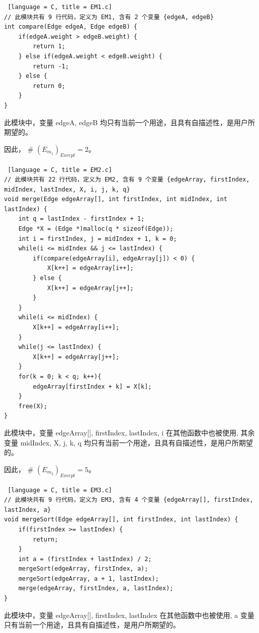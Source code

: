 \documentclass[14pt,a4paper,UTF8,twoside]{article}
\begin{document}
\begin{lstlisting} [language = C, title = EM1.c]
// 此模块共有 9 行代码，定义为 EM1, 含有 2 个变量 {edgeA, edgeB}
int compare(Edge edgeA, Edge edgeB) {
    if(edgeA.weight > edgeB.weight) {
        return 1;
    } else if(edgeA.weight < edgeB.weight) {
        return -1;
    } else {
        return 0;
    }
}
\end{lstlisting}

此模块中，变量 edgeA, edgeB 均只有当前一个用途，且具有自描述性，是用户所期望的。

因此， \# $(E_{m_1})_{Except} = 2$。

\begin{lstlisting} [language = C, title = EM2.c]
// 此模块共有 22 行代码，定义为 EM2, 含有 9 个变量 {edgeArray, firstIndex, midIndex, lastIndex, X, i, j, k, q}
void merge(Edge edgeArray[], int firstIndex, int midIndex, int lastIndex) {
    int q = lastIndex - firstIndex + 1;
    Edge *X = (Edge *)malloc(q * sizeof(Edge));
    int i = firstIndex, j = midIndex + 1, k = 0;
    while(i <= midIndex && j <= lastIndex) {
        if(compare(edgeArray[i], edgeArray[j]) < 0) {
            X[k++] = edgeArray[i++];
        } else {
            X[k++] = edgeArray[j++];
        }
    }
    while(i <= midIndex) {
        X[k++] = edgeArray[i++];
    }
    while(j <= lastIndex) {
        X[k++] = edgeArray[j++];
    }
    for(k = 0; k < q; k++){
        edgeArray[firstIndex + k] = X[k];
    }
    free(X);
}
\end{lstlisting}

此模块中，变量 edgeArray[], firstIndex, lastIndex, i 在其他函数中也被使用, 
其余变量 midIndex, X, j, k, q 均只有当前一个用途，且具有自描述性，是用户所期望的。

因此， \# $(E_{m_2})_{Except} = 5$。

\begin{lstlisting} [language = C, title = EM3.c]
// 此模块共有 9 行代码，定义为 EM3, 含有 4 个变量 {edgeArray[], firstIndex, lastIndex, a}
void mergeSort(Edge edgeArray[], int firstIndex, int lastIndex) {
    if(firstIndex >= lastIndex) {
        return;
    }
    int a = (firstIndex + lastIndex) / 2;
    mergeSort(edgeArray, firstIndex, a);
    mergeSort(edgeArray, a + 1, lastIndex);
    merge(edgeArray, firstIndex, a, lastIndex);
}
\end{lstlisting}

此模块中，变量 edgeArray[], firstIndex, lastIndex 在其他函数中也被使用, 
a 变量只有当前一个用途，且具有自描述性，是用户所期望的。
\end{document}
